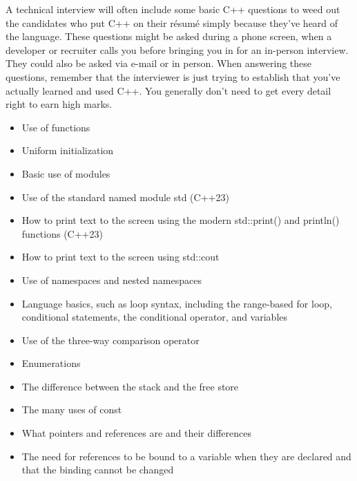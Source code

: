 
A technical interview will often include some basic C++ questions to weed out the candidates who put C++ on their résumé simply because they’ve heard of the language. These questions might be asked during a phone screen, when a developer or recruiter calls you before bringing you in for an in-person interview. They could also be asked via e-mail or in person. When answering these questions, remember that the interviewer is just trying to establish that you’ve actually learned and used C++. You generally don’t need to get every detail right to earn high marks.


\begin{itemize}
\item
Use of functions

\item
Uniform initialization

\item
Basic use of modules

\item
Use of the standard named module std (C++23)

\item
How to print text to the screen using the modern std::print() and println() functions (C++23)

\item
How to print text to the screen using std::cout

\item
Use of namespaces and nested namespaces

\item
Language basics, such as loop syntax, including the range-based for loop, conditional statements, the conditional operator, and variables

\item
Use of the three-way comparison operator

\item
Enumerations

\item
The difference between the stack and the free store

\item
The many uses of const

\item
What pointers and references are and their differences

\item
The need for references to be bound to a variable when they are declared and that the binding cannot be changed


\end{itemize}
